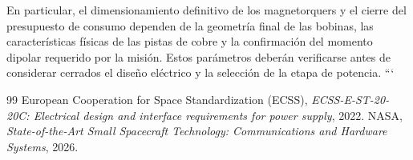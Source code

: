 \documentclass[11pt,a4paper]{article}
\begin{document}
En particular, el dimensionamiento definitivo de los magnetorquers
y el cierre del presupuesto de consumo dependen de la geometría
final de las bobinas, las características físicas de las pistas de
cobre y la confirmación del momento dipolar requerido por la misión.
Estos parámetros deberán verificarse antes de considerar cerrados
el diseño eléctrico y la selección de la etapa de potencia.
```


\begin{thebibliography}{99}
 European Cooperation for Space Standardization (ECSS), \textit{ECSS-E-ST-20-20C: Electrical design and interface requirements for power supply}, 2022.
 NASA, \textit{State-of-the-Art Small Spacecraft Technology: Communications and Hardware Systems}, 2026.
\end{thebibliography}
\end{document}
